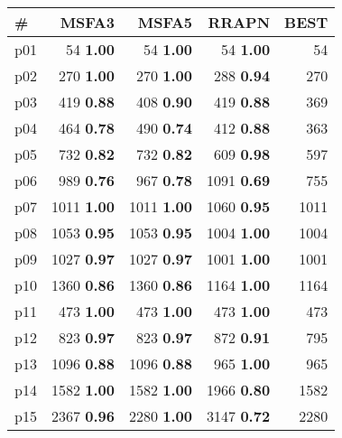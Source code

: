 \begin{tabular}{|l|rrr|r|}
\hline
\textbf{\#} & \textbf{MSFA3} & \textbf{MSFA5} & \textbf{RRAPN} & \textbf{BEST}\\
\hline
p01 & {\footnotesize 54} \textbf{1.00} & {\footnotesize 54} \textbf{1.00} & {\footnotesize 54} \textbf{1.00} & 54\\
p02 & {\footnotesize 270} \textbf{1.00} & {\footnotesize 270} \textbf{1.00} & {\footnotesize 288} \textbf{0.94} & 270\\
p03 & {\footnotesize 419} \textbf{0.88} & {\footnotesize 408} \textbf{0.90} & {\footnotesize 419} \textbf{0.88} & 369\\
p04 & {\footnotesize 464} \textbf{0.78} & {\footnotesize 490} \textbf{0.74} & {\footnotesize 412} \textbf{0.88} & 363\\
p05 & {\footnotesize 732} \textbf{0.82} & {\footnotesize 732} \textbf{0.82} & {\footnotesize 609} \textbf{0.98} & 597\\
p06 & {\footnotesize 989} \textbf{0.76} & {\footnotesize 967} \textbf{0.78} & {\footnotesize 1091} \textbf{0.69} & 755\\
p07 & {\footnotesize 1011} \textbf{1.00} & {\footnotesize 1011} \textbf{1.00} & {\footnotesize 1060} \textbf{0.95} & 1011\\
p08 & {\footnotesize 1053} \textbf{0.95} & {\footnotesize 1053} \textbf{0.95} & {\footnotesize 1004} \textbf{1.00} & 1004\\
p09 & {\footnotesize 1027} \textbf{0.97} & {\footnotesize 1027} \textbf{0.97} & {\footnotesize 1001} \textbf{1.00} & 1001\\
p10 & {\footnotesize 1360} \textbf{0.86} & {\footnotesize 1360} \textbf{0.86} & {\footnotesize 1164} \textbf{1.00} & 1164\\
p11 & {\footnotesize 473} \textbf{1.00} & {\footnotesize 473} \textbf{1.00} & {\footnotesize 473} \textbf{1.00} & 473\\
p12 & {\footnotesize 823} \textbf{0.97} & {\footnotesize 823} \textbf{0.97} & {\footnotesize 872} \textbf{0.91} & 795\\
p13 & {\footnotesize 1096} \textbf{0.88} & {\footnotesize 1096} \textbf{0.88} & {\footnotesize 965} \textbf{1.00} & 965\\
p14 & {\footnotesize 1582} \textbf{1.00} & {\footnotesize 1582} \textbf{1.00} & {\footnotesize 1966} \textbf{0.80} & 1582\\
p15 & {\footnotesize 2367} \textbf{0.96} & {\footnotesize 2280} \textbf{1.00} & {\footnotesize 3147} \textbf{0.72} & 2280\\

\end{tabular}
